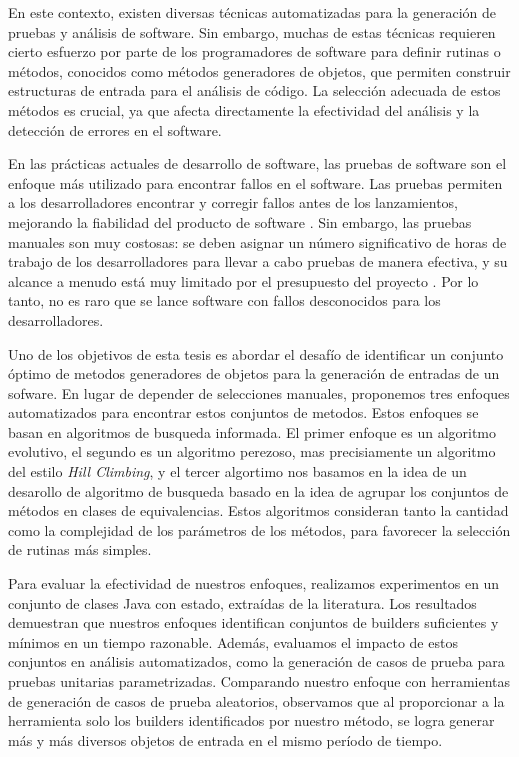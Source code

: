 En este contexto, existen diversas técnicas automatizadas para la generación de pruebas y análisis de software. Sin embargo, muchas de estas técnicas requieren cierto esfuerzo por parte de los programadores de software para definir rutinas o métodos, 
conocidos como métodos generadores de objetos, que permiten construir estructuras de entrada para el análisis de código. La selección adecuada de estos métodos es crucial, ya que afecta directamente la efectividad del análisis y la detección de errores en el software.

En las prácticas actuales de desarrollo de software, las pruebas de software son el enfoque más utilizado para encontrar fallos en el software. Las pruebas permiten a los desarrolladores encontrar y corregir fallos antes de los lanzamientos, mejorando la fiabilidad del producto de software \cite{Ammann16,Myers11}. Sin embargo, las pruebas manuales son muy costosas: se deben asignar un número significativo de horas de trabajo de los desarrolladores para llevar a cabo pruebas de manera efectiva, y su alcance a menudo está muy limitado por el presupuesto del proyecto \cite{Ammann16,Myers11}. Por lo tanto, no es raro que se lance software con fallos desconocidos para los desarrolladores.

Uno de los objetivos de esta tesis es abordar el desafío de identificar un conjunto óptimo de metodos generadores de objetos para la generación de entradas de un sofware. En lugar de depender de selecciones manuales, proponemos tres enfoques automatizados para encontrar estos conjuntos de metodos. Estos enfoques se basan en algoritmos de busqueda informada.  El primer enfoque es un algoritmo evolutivo, el segundo es un algoritmo perezoso, mas precisiamente un algoritmo del estilo \emph{Hill Climbing}, y el tercer algortimo nos basamos en la idea de un desarollo de algoritmo de busqueda basado en la idea de agrupar los conjuntos de métodos en clases de equivalencias. Estos algoritmos consideran tanto la cantidad como la complejidad de los parámetros de los métodos, para favorecer la selección de rutinas más simples.

Para evaluar la efectividad de nuestros enfoques, realizamos experimentos en un conjunto de clases Java con estado, extraídas de la literatura. Los resultados demuestran que nuestros enfoques identifican conjuntos de builders suficientes y mínimos en un tiempo razonable. Además, evaluamos el impacto de estos conjuntos en análisis automatizados, como la generación de casos de prueba para pruebas unitarias parametrizadas. Comparando nuestro enfoque con herramientas de generación de casos de prueba aleatorios, observamos que al proporcionar a la herramienta solo los builders identificados por nuestro método, se logra generar más y más diversos objetos de entrada en el mismo período de tiempo.

